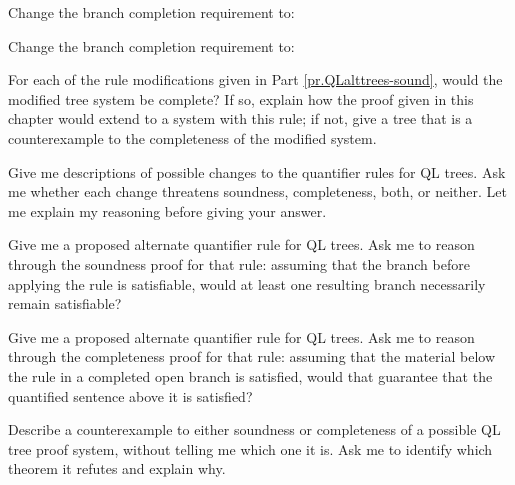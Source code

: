 \begin{earg}
\item Change the branch completion requirement to:

\item Change the branch completion requirement to:
	
	\end{earg}
	

	
\solutions
\problempart
\label{pr.QLalttrees-complete}
For each of the rule modifications given in Part \ref{pr.QLalttrees-sound}, would the modified tree system be complete? If so, explain how the proof given in this chapter would extend to a system with this rule; if not, give a tree that is a counterexample to the completeness of the modified system.



\begin{genaipractice}[]

\item Give me descriptions of possible changes to the quantifier rules for QL trees. Ask me whether each change threatens soundness, completeness, both, or neither. Let me explain my reasoning before giving your answer.
\item Give me a proposed alternate quantifier rule for QL trees. Ask me to reason through the soundness proof for that rule: assuming that the branch before applying the rule is satisfiable, would at least one resulting branch necessarily remain satisfiable?
\item Give me a proposed alternate quantifier rule for QL trees. Ask me to reason through the completeness proof for that rule: assuming that the material below the rule in a completed open branch is satisfied, would that guarantee that the quantified sentence above it is satisfied?
\item Describe a counterexample to either soundness or completeness of a possible QL tree proof system, without telling me which one it is. Ask me to identify which theorem it refutes and explain why.

\end{genaipractice}
